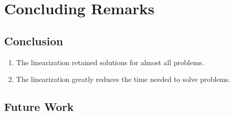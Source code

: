 \chapter{Concluding Remarks}\label{chap:conclusion}

\section{Conclusion}

\begin{enumerate}
 \item The linearization retained solutions for almost all problems.
 \item The linearization greatly reduces the time needed to solve problems.
\end{enumerate}


\section{Future Work}
 